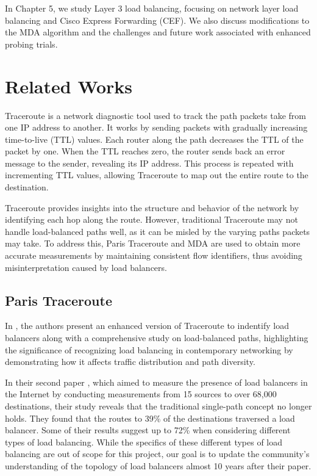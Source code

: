 \documentclass[12pt]{cwru_thesis}
\begin{document}
In Chapter 5, we study Layer 3 load balancing, focusing on network layer load balancing and Cisco Express Forwarding (CEF). We also discuss modifications to the MDA algorithm and the challenges and future work associated with enhanced probing trials.










\chapter{Related Works}

Traceroute is a network diagnostic tool used to track the path packets take from one IP address to another. It works by sending packets with gradually increasing time-to-live (TTL) values. Each router along the path decreases the TTL of the packet by one. When the TTL reaches zero, the router sends back an error message to the sender, revealing its IP address. This process is repeated with incrementing TTL values, allowing Traceroute to map out the entire route to the destination.

Traceroute provides insights into the structure and behavior of the network by identifying each hop along the route. However, traditional Traceroute may not handle load-balanced paths well, as it can be misled by the varying paths packets may take. To address this, Paris Traceroute and MDA are used to obtain more accurate measurements by maintaining consistent flow identifiers, thus avoiding misinterpretation caused by load balancers.

\section{Paris Traceroute}
In  \cite{4261334}, the authors present an enhanced version of Traceroute to indentify load balancers along with a comprehensive study on load-balanced paths, highlighting the significance of recognizing load balancing in contemporary networking by demonstrating how it affects traffic distribution and path diversity. 

In their second paper  \cite{augustin2010measuring}, which aimed to measure the presence of load balancers in the Internet by conducting measurements from 15 sources to over 68,000 destinations, their study reveals that the traditional single-path concept no longer holds. They found that the routes to 39\% of the destinations traversed a load balancer. Some of their results suggest up to 72\% when considering different types of load balancing. While the specifics of these different types of load balancing are out of scope for this project, our goal is to update the community's understanding of the topology of load balancers almost 10 years after their paper.
\end{document}

